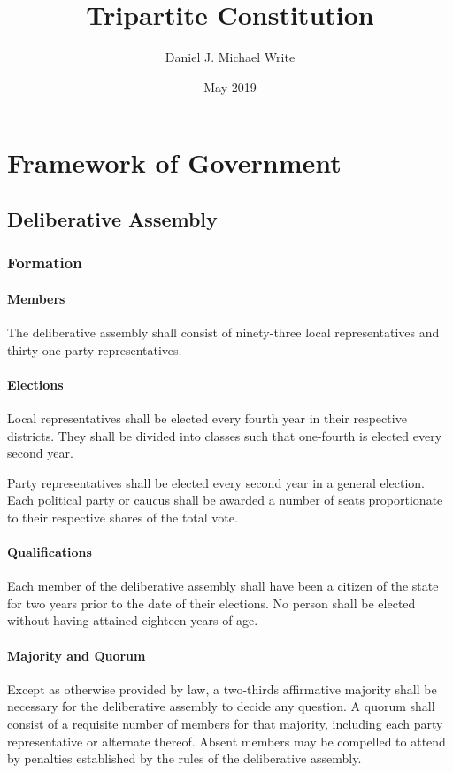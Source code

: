 \documentclass{article}
\title{Tripartite Constitution}
\date{May 2019}
\author{Daniel J. Michael Write}
\begin{document}
\maketitle
\newpage
\tableofcontents
\newpage
\section{Framework of Government}
\subsection{Deliberative Assembly}
\subsubsection{Formation}
\paragraph{Members}
The deliberative assembly shall consist of ninety-three local representatives and thirty-one party representatives.
\paragraph{Elections}
Local representatives shall be elected every fourth year in their respective districts. They shall be divided into classes such that one-fourth is elected every second year.

Party representatives shall be elected every second year in a general election. Each political party or caucus shall be awarded a number of seats proportionate to their respective shares of the total vote.
\paragraph{Qualifications}
Each member of the deliberative assembly shall have been a citizen of the state for two years prior to the date of their elections. No person shall be elected without having attained eighteen years of age.
\paragraph{Majority and Quorum}
Except as otherwise provided by law, a two-thirds affirmative majority shall be necessary for the deliberative assembly to decide any question. A quorum shall consist of a requisite number of members for that majority, including each party representative or alternate thereof. Absent members may be compelled to attend by penalties established by the rules of the deliberative assembly.
\end{document}
